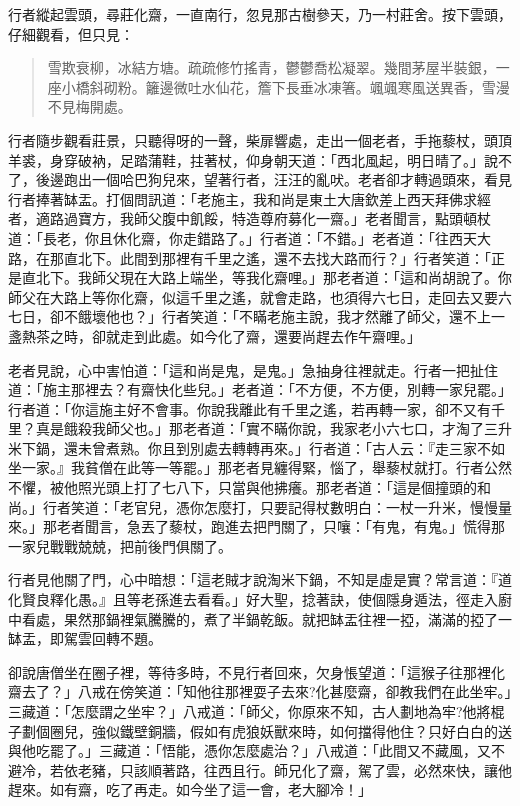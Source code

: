 行者縱起雲頭，尋莊化齋，一直南行，忽見那古樹參天，乃一村莊舍。按下雲頭，仔細觀看，但只見：
\begin{quote}
雪欺衰柳，冰結方塘。疏疏修竹搖青，鬱鬱喬松凝翠。幾間茅屋半裝銀，一座小橋斜砌粉。籬邊微吐水仙花，簷下長垂冰凍箸。颯颯寒風送異香，雪漫不見梅開處。
\end{quote}

行者隨步觀看莊景，只聽得呀的一聲，柴扉響處，走出一個老者，手拖藜杖，頭頂羊裘，身穿破衲，足踏蒲鞋，拄著杖，仰身朝天道：「西北風起，明日晴了。」說不了，後邊跑出一個哈巴狗兒來，望著行者，汪汪的亂吠。老者卻才轉過頭來，看見行者捧著缽盂。打個問訊道：「老施主，我和尚是東土大唐欽差上西天拜佛求經者，適路過寶方，我師父腹中飢餒，特造尊府募化一齋。」老者聞言，點頭頓杖道：「長老，你且休化齋，你走錯路了。」行者道：「不錯。」老者道：「往西天大路，在那直北下。此間到那裡有千里之遙，還不去找大路而行？」行者笑道：「正是直北下。我師父現在大路上端坐，等我化齋哩。」那老者道：「這和尚胡說了。你師父在大路上等你化齋，似這千里之遙，就會走路，也須得六七日，走回去又要六七日，卻不餓壞他也？」行者笑道：「不瞞老施主說，我才然離了師父，還不上一盞熱茶之時，卻就走到此處。如今化了齋，還要尚趕去作午齋哩。」

老者見說，心中害怕道：「這和尚是鬼，是鬼。」急抽身往裡就走。行者一把扯住道：「施主那裡去？有齋快化些兒。」老者道：「不方便，不方便，別轉一家兒罷。」行者道：「你這施主好不會事。你說我離此有千里之遙，若再轉一家，卻不又有千里？真是餓殺我師父也。」那老者道：「實不瞞你說，我家老小六七口，才淘了三升米下鍋，還未曾煮熟。你且到別處去轉轉再來。」行者道：「古人云：『走三家不如坐一家。』我貧僧在此等一等罷。」那老者見纏得緊，惱了，舉藜杖就打。行者公然不懼，被他照光頭上打了七八下，只當與他拂癢。那老者道：「這是個撞頭的和尚。」行者笑道：「老官兒，憑你怎麼打，只要記得杖數明白：一杖一升米，慢慢量來。」那老者聞言，急丟了藜杖，跑進去把門關了，只嚷：「有鬼，有鬼。」慌得那一家兒戰戰兢兢，把前後門俱關了。

行者見他關了門，心中暗想：「這老賊才說淘米下鍋，不知是虛是實？常言道：『道化賢良釋化愚。』且等老孫進去看看。」好大聖，捻著訣，使個隱身遁法，徑走入廚中看處，果然那鍋裡氣騰騰的，煮了半鍋乾飯。就把缽盂往裡一掗，滿滿的掗了一缽盂，即駕雲回轉不題。

卻說唐僧坐在圈子裡，等待多時，不見行者回來，欠身悵望道：「這猴子往那裡化齋去了？」八戒在傍笑道：「知他往那裡耍子去來?化甚麼齋，卻教我們在此坐牢。」三藏道：「怎麼謂之坐牢？」八戒道：「師父，你原來不知，古人劃地為牢?他將棍子劃個圈兒，強似鐵壁銅牆，假如有虎狼妖獸來時，如何擋得他住？只好白白的送與他吃罷了。」三藏道：「悟能，憑你怎麼處治？」八戒道：「此間又不藏風，又不避冷，若依老豬，只該順著路，往西且行。師兄化了齋，駕了雲，必然來快，讓他趕來。如有齋，吃了再走。如今坐了這一會，老大腳冷！」

